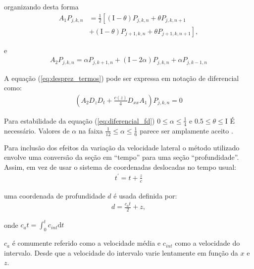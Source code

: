 organizando desta forma 
\begin{align*}
A_{1} P_{j, k, n} &=\frac{1}{2}\left[(\mathrm{I}-\theta) P_{j, k, n}+\theta P_{j, k, n+1}\right.\\ &\left.+(\mathrm{I}-\theta) P_{j+1, k, n}+\theta P_{j+1, k, n+1}\right],
\end{align*}

e
\begin{align*}
A_{2} P_{j, k, n}=\alpha P_{j, k+1, n}+(\mathrm{I}-2 \alpha) P_{j, k, n}+\alpha P_{j, k-1, n}
\end{align*}


A equação (\ref{eq:desprez_termos}) pode ser expressa em notação de diferencial como:
\begin{align}
\left(A_{2} D_{z} D_{t}+\frac{c(z)}{4} D_{x x} A_{1}\right) P_{j, k, n}=0
\label{eq:diferencial_fd}
\end{align}

Para estabilidade da equação (\ref{eq:diferencial_fd}) $0 \leqslant \alpha \leqslant \frac{1}{4}$ e $0.5 \leqslant \theta \leqslant \mathrm{I}$ É necessário. Valores de $\alpha$ na faixa $\frac{1}{12} \leqslant \alpha \leqslant \frac{1}{6}$ parece ser amplamente aceito \citep{Claerbout(1985)}.

Para inclusão dos efeitos da variação da velocidade lateral o método utilizado envolve uma conversão da seção em ``tempo'' para uma seção ``profundidade''. Assim, em vez de usar o sistema de coordenadas deslocadas no tempo usual:
\begin{align*}
t^{\prime}=t+\frac{z}{c}
\end{align*}

uma coordenada de profundidade $d$ é usada definida por:
\begin{align*}
d=\frac{c_{a} t}{2}+z
,
\end{align*}

onde $c_{a} t=\int_{0}^{t} c_{int} \mathrm{d} t$

$c_{a}$ é comumente referido como a velocidade média e $c_{int}$ como a velocidade do intervalo. Desde que a velocidade do intervalo varie lentamente em função da $x$ e $z$.


